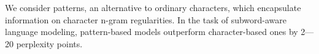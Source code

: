We consider patterns, an alternative to ordinary characters, which encapsulate information on character n-gram regularities. In the task of subword-aware language modeling, pattern-based models outperform character-based ones by 2---20 perplexity points.
